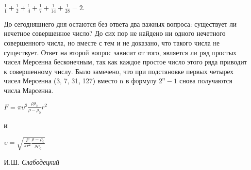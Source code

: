 \begin{multicols*}{2}
$\frac{1}{1} + \frac{1}{2} + \frac{1}{4} + \frac{1}{7} + \frac{1}{14} + \frac{1}{28} = 2.$\\\par
До сегодняшнего дня остаются без ответа два важных вопроса: существует ли нечетное совершенное число?
До сих пор не найдено ни одного нечетного совершенного числа, но вместе с тем и не доказано, что такого числа не существует. Ответ на второй вопрос зависит от того, является ли ряд простых чисел Мерсенна бесконечным, так как каждое простое число этого ряда приводит к совершенному числу. Было замечено, что при подстановке первых четырех чисел Мерсенна (3, 7, 31, 127) вместо n в формулу $2^n - 1$ снова получаются числа Марсенна.\\
\begin{center}
	\fontsize{19pt}{0}
$F = \pi\upsilon^2\frac{\rho\rho_0}{\rho - \rho_0}r^2$\\
\end{center}
и\\
\begin{center}
	\fontsize{19pt}{0}
$\upsilon = \sqrt{\frac{F}{\pi r^2} \frac{\rho - \rho_0}{\rho\rho_0}}$
\end{center}
\begin{flushright}
	И.Ш. \textit{Слабодецкий}
\end{flushright}
\end{multicols*}
